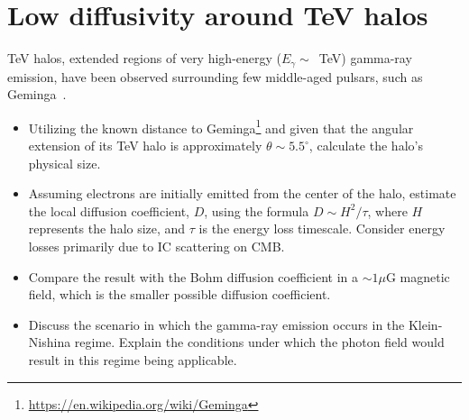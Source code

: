 \section{Low diffusivity around TeV halos}

TeV halos, extended regions of very high-energy ($E_\gamma \sim$~TeV) gamma-ray emission, have been observed surrounding few middle-aged pulsars, such as Geminga~\cite{2017Sci...358..911A}.

\begin{itemize}
\item Utilizing the known distance to Geminga\footnote{\url{https://en.wikipedia.org/wiki/Geminga}} and given that the angular extension of its TeV halo is approximately \(\theta \sim 5.5^\circ\), calculate the halo's physical size.
\item Assuming electrons are initially emitted from the center of the halo, estimate the local diffusion coefficient, $D$, using the formula $D \sim H^2/\tau$, where $H$ represents the halo size, and $\tau$ is the energy loss timescale. Consider energy losses primarily due to IC scattering on CMB.
\item Compare the result with the Bohm diffusion coefficient in a $\sim 1 \mu$G magnetic field, which is the smaller possible diffusion coefficient.
\item Discuss the scenario in which the gamma-ray emission occurs in the Klein-Nishina regime. Explain the conditions under which the photon field would result in this regime being applicable.
\end{itemize}
